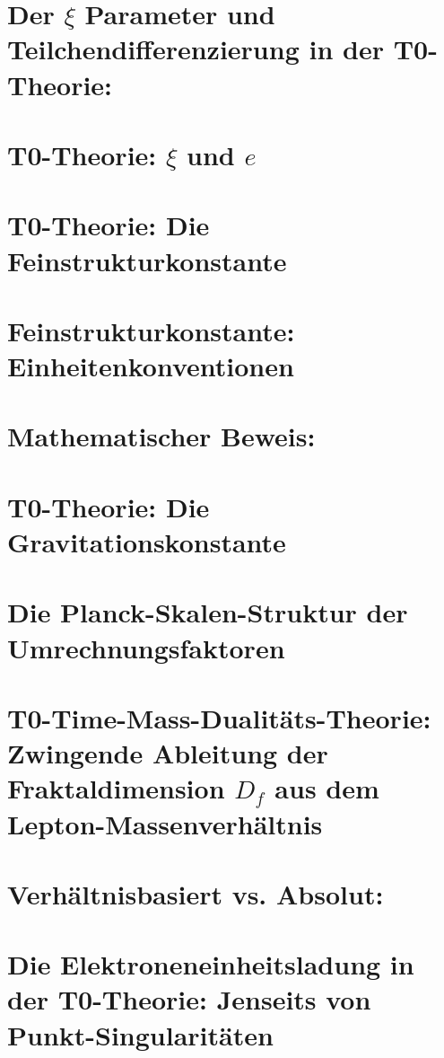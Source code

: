 	\chapter{Der $\xi$ Parameter und Teilchendifferenzierung in der T0-Theorie:}
	
	\chapter{T0-Theorie: $\xi$ und $e$}
	
	\chapter{T0-Theorie: Die Feinstrukturkonstante}
	
	\chapter{Feinstrukturkonstante: Einheitenkonventionen}
	
	\chapter{Mathematischer Beweis:}
	
	\chapter{T0-Theorie: Die Gravitationskonstante}
	
	\chapter{Die Planck-Skalen-Struktur der Umrechnungsfaktoren}
	
	\chapter{T0-Time-Mass-Dualitäts-Theorie: Zwingende Ableitung der Fraktaldimension $D_f$ aus dem Lepton-Massenverhältnis}
	
	\chapter{Verhältnisbasiert vs. Absolut:}
	
	\chapter{Die Elektroneneinheitsladung in der T0-Theorie: Jenseits von Punkt-Singularitäten}
	
